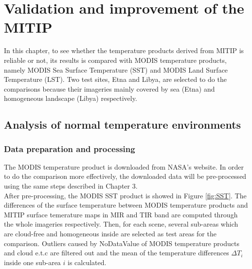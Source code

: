 \chapter{Validation and improvement of the MITIP}

\label{Chapter4}

In this chapter, to see whether the temperature products derived from MITIP is reliable or not, its results is compared with MODIS temperature products, namely MODIS Sea Surface Temperature (SST) and MODIS Land Surface Temperature (LST). Two test sites, Etna and Libya, are selected to do the comparisons because their imageries mainly covered by sea (Etna) and homogeneous landscape (Libya) respectively.\\


\section{Analysis of normal temperature environments}


\subsection{Data preparation and processing}
The MODIS temperature product is downloaded from NASA's website. In order to do the comparison more effectively, the downloaded data will be pre-processed using the same steps described in Chapter 3.\\

\noindent After pre-processing, the MODIS SST product is showed in Figure \ref{fig:SST}. The differences of the surface temperature between MODIS temperature products and MITIP surface temerature maps in MIR and TIR band are computed through the whole imageries respectively. Then, for each scene, several sub-areas which are cloud-free and homogeneous inside are selected as test areas for the comparison. Outliers caused by NoDataValue of MODIS temperature products and cloud e.t.c are filtered out and the mean of the temperature differences $\Delta T_i$ inside one sub-area $i$ is calculated.\\

